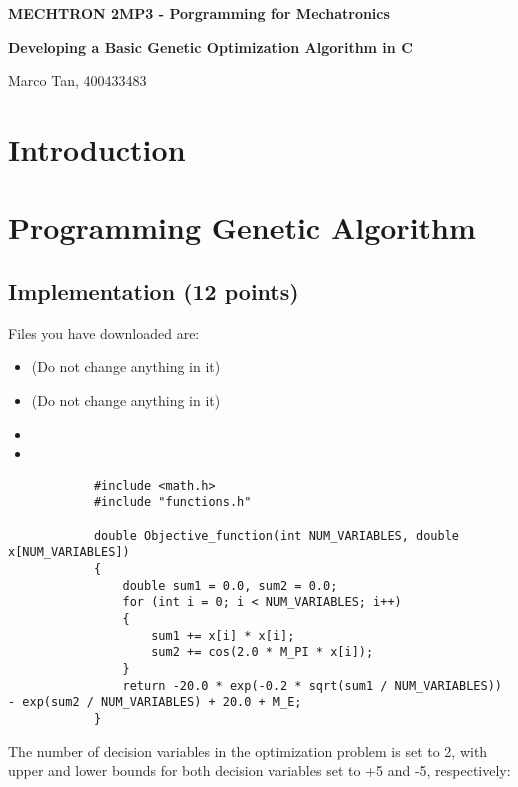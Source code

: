 \documentclass[12pt]{article}
\begin{document}
	
	\justifying
	
	\begin{center}
		\textbf{{\large MECHTRON 2MP3 - Porgramming for Mechatronics}}
		
		\textbf{Developing a Basic Genetic Optimization Algorithm in C} 
		
		Marco Tan, 400433483
	\end{center}
	

	
	
	
	\section{Introduction}
	
	
	\section{Programming Genetic Algorithm}

	\subsection{Implementation (12 points)}
	
	Files you have downloaded are:
	
	\begin{itemize}
		\item {} (Do not change anything in it)
		\item {} (Do not change anything in it)
		\item {}
		\item {}
	\end{itemize}

		
		\begin{lstlisting}
			#include <math.h>
			#include "functions.h"
			
			double Objective_function(int NUM_VARIABLES, double x[NUM_VARIABLES])
			{
				double sum1 = 0.0, sum2 = 0.0;
				for (int i = 0; i < NUM_VARIABLES; i++)
				{
					sum1 += x[i] * x[i];
					sum2 += cos(2.0 * M_PI * x[i]);
				}
				return -20.0 * exp(-0.2 * sqrt(sum1 / NUM_VARIABLES)) - exp(sum2 / NUM_VARIABLES) + 20.0 + M_E;
			}
		\end{lstlisting}
	
	

	
	
	The number of decision variables in the optimization problem is set to 2, with upper and lower bounds for both decision variables set to +5 and -5, respectively:
	
\end{document}
